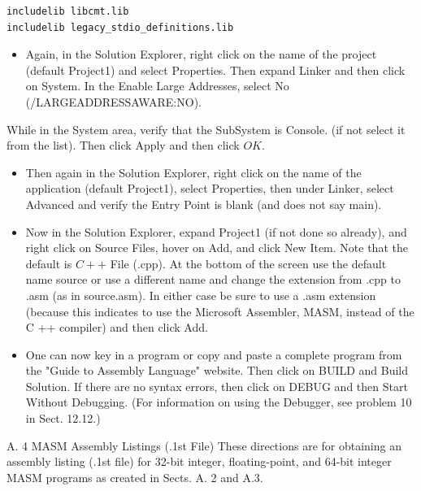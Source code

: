 \documentclass[10pt]{book}
\begin{document}
\begin{verbatim}
includelib libcmt.lib
includelib legacy_stdio_definitions.lib
\end{verbatim}

\begin{itemize}
  \item Again, in the Solution Explorer, right click on the name of the project (default Project1) and select Properties. Then expand Linker and then click on System. In the Enable Large Addresses, select No (/LARGEADDRESSAWARE:NO).
\end{itemize}

While in the System area, verify that the SubSystem is Console. (if not select it from the list). Then click Apply and then click $O K$.

\begin{itemize}
  \item Then again in the Solution Explorer, right click on the name of the application (default Project1), select Properties, then under Linker, select Advanced and verify the Entry Point is blank (and does not say main).
  \item Now in the Solution Explorer, expand Project1 (if not done so already), and right click on Source Files, hover on Add, and click New Item. Note that the default is $C++$ File (.cpp). At the bottom of the screen use the default name source or use a different name and change the extension from .cpp to .asm (as in source.asm). In either case be sure to use a .asm extension (because this indicates to use the Microsoft Assembler, MASM, instead of the C ++ compiler) and then click Add.
  \item One can now key in a program or copy and paste a complete program from the "Guide to Assembly Language" website. Then click on BUILD and Build Solution. If there are no syntax errors, then click on DEBUG and then Start Without Debugging. (For information on using the Debugger, see problem 10 in Sect. 12.12.)
\end{itemize}

A. 4 MASM Assembly Listings (.1st File)
These directions are for obtaining an assembly listing (.1st file) for 32-bit integer, floating-point, and 64-bit integer MASM programs as created in Sects. A. 2 and A.3.
\end{document}
